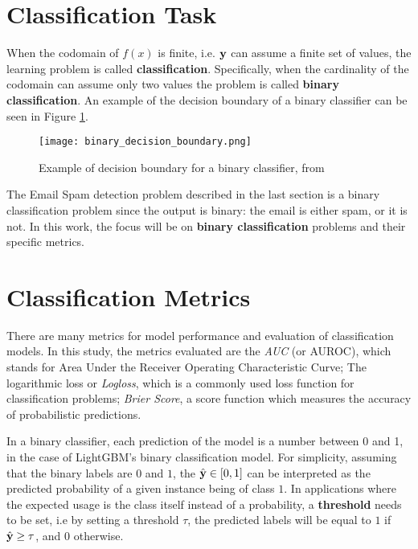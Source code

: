 \section{Classification Task}

When the codomain of $f(x)$ is finite, i.e. $\textbf{\text{\textup{y}}}$ can assume a finite set of values, the learning problem is called \textbf{classification}. Specifically, when the cardinality of the codomain can assume only two values the problem is called \textbf{binary classification}. An example of the decision boundary of a binary classifier can be seen in Figure \ref{fig:binaryclassifier}.

\begin{figure}[H]
    \centering
    \texttt{[image: binary\_decision\_boundary.png]} 
    \caption{Example of decision boundary for a binary classifier, from \cite{hastie2009elements}}
    \label{fig:binaryclassifier}
\end{figure}

The Email Spam detection problem described in the last section is a binary classification problem since the output is binary: the email is either spam, or it is not. In this work, the focus will be on \textbf{binary classification} problems and their specific metrics.

\section{Classification Metrics}
\label{classification-metrics}

There are many metrics for model performance and evaluation of classification models. In this study, the metrics evaluated are the \textit{AUC} (or AUROC), which stands for Area Under the Receiver Operating Characteristic Curve; The logarithmic loss or \textit{Logloss}, which is a commonly used loss function for classification problems; \textit{Brier Score}, a score function which measures the accuracy of probabilistic predictions.

In a binary classifier, each prediction of the model is a number between 0 and 1, in the case of LightGBM's binary classification model. For simplicity, assuming that the binary labels are $0$ and $1$, the $\hat{\textbf{{\text{\textup{y}}}}}\in [0, 1]$ can be interpreted as the predicted probability of a given instance being of class $1$. In applications where the expected usage is the class itself instead of a probability, a \textbf{threshold} needs to be set, i.e by setting a threshold $\tau$, the predicted labels will be equal to $1$ if $\hat{\textbf{{\text{\textup{y}}}}} \geq \tau$, and $0$ otherwise.


